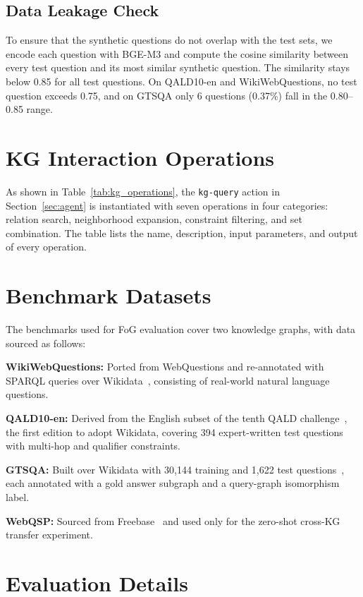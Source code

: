 \subsection{Data Leakage Check}
\label{app:leakage}
To ensure that the synthetic questions do not overlap with the test sets, we encode each question with BGE-M3 and compute the cosine similarity between every test question and its most similar synthetic question. The similarity stays below 0.85 for all test questions. On QALD10-en and WikiWebQuestions, no test question exceeds 0.75, and on GTSQA only 6 questions (0.37\%) fall in the 0.80--0.85 range.

\section{KG Interaction Operations}
\label{app:kg_ops}

As shown in Table~\ref{tab:kg_operations}, the \texttt{kg-query} action in Section~\ref{sec:agent} is instantiated with seven operations in four categories: relation search, neighborhood expansion, constraint filtering, and set combination. The table lists the name, description, input parameters, and output of every operation.

\section{Benchmark Datasets}
\label{app:datasets}
\label{app:datasets_detail}
The benchmarks used for FoG evaluation cover two knowledge graphs, with data sourced as follows:

\textbf{WikiWebQuestions:} Ported from WebQuestions and re-annotated with SPARQL queries over Wikidata~\cite{wikiwebQuestions}, consisting of real-world natural language questions.

\textbf{QALD10-en:} Derived from the English subset of the tenth QALD challenge~\cite{qald10en}, the first edition to adopt Wikidata, covering 394 expert-written test questions with multi-hop and qualifier constraints.

\textbf{GTSQA:} Built over Wikidata with 30,144 training and 1,622 test questions~\cite{GTSQA}, each annotated with a gold answer subgraph and a query-graph isomorphism label.

\textbf{WebQSP:} Sourced from Freebase~\cite{webqsp} and used only for the zero-shot cross-KG transfer experiment.

\section{Evaluation Details}
\label{app:evaluation}

